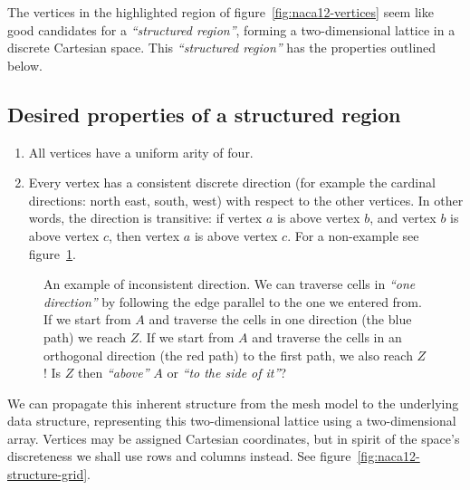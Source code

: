 The vertices in the highlighted region of figure~\ref{fig:naca12-vertices} seem like good candidates for a \emph{``structured region''}, forming a two-dimensional lattice in a discrete Cartesian space. This \emph{``structured region''} has the properties outlined below.


\subsection{Desired properties of a structured region}
\label{sec:structured-region-properties}
\begin{enumerate}
\item All vertices have a uniform arity of four.
\item Every vertex has a consistent discrete direction (for example the cardinal directions: north east, south, west) with respect to the other vertices. In other words, the direction is transitive: if vertex $a$ is above vertex $b$, and vertex $b$ is above vertex $c$, then vertex $a$ is above vertex $c$. For a non-example see figure~\ref{fig:non-consistent-direction}.
\end{enumerate}

\begin{figure}

\caption{An example of inconsistent direction. We can traverse cells in \emph{``one direction''} by following the edge parallel to the one we entered from. If we start from $A$ and traverse the cells in one direction (the blue path) we reach $Z$. If we start from $A$ and traverse the cells in an orthogonal direction (the red path) to the first path, we also reach $Z$! Is $Z$ then \emph{``above''} $A$ or \emph{``to the side of it''}?}
\label{fig:non-consistent-direction}
\end{figure}


We can propagate this inherent structure from the mesh model to the underlying data structure, representing this two-dimensional lattice using a two-dimensional array. Vertices may be assigned Cartesian coordinates, but in spirit of the space's discreteness we shall use rows and columns instead. See figure~\ref{fig:naca12-structure-grid}.\label{sentence:2d-array}

